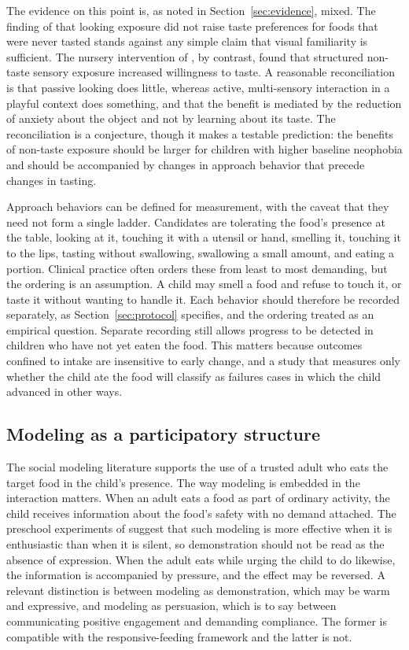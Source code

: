 \documentclass[11pt]{article}
\theoremstyle{remark}
\begin{document}
The evidence on this point is, as noted in Section~\ref{sec:evidence}, mixed. The finding of \citet{birch1987what} that looking exposure did not raise taste preferences for foods that were never tasted stands against any simple claim that visual familiarity is sufficient. The nursery intervention of \citet{dazeley2015exposure}, by contrast, found that structured non-taste sensory exposure increased willingness to taste. A reasonable reconciliation is that passive looking does little, whereas active, multi-sensory interaction in a playful context does something, and that the benefit is mediated by the reduction of anxiety about the object and not by learning about its taste. The reconciliation is a conjecture, though it makes a testable prediction: the benefits of non-taste exposure should be larger for children with higher baseline neophobia and should be accompanied by changes in approach behavior that precede changes in tasting.

Approach behaviors can be defined for measurement, with the caveat that they need not form a single ladder. Candidates are tolerating the food's presence at the table, looking at it, touching it with a utensil or hand, smelling it, touching it to the lips, tasting without swallowing, swallowing a small amount, and eating a portion. Clinical practice often orders these from least to most demanding, but the ordering is an assumption. A child may smell a food and refuse to touch it, or taste it without wanting to handle it. Each behavior should therefore be recorded separately, as Section~\ref{sec:protocol} specifies, and the ordering treated as an empirical question. Separate recording still allows progress to be detected in children who have not yet eaten the food. This matters because outcomes confined to intake are insensitive to early change, and a study that measures only whether the child ate the food will classify as failures cases in which the child advanced in other ways.

\subsection{Modeling as a participatory structure}

The social modeling literature supports the use of a trusted adult who eats the target food in the child's presence. The way modeling is embedded in the interaction matters. When an adult eats a food as part of ordinary activity, the child receives information about the food's safety with no demand attached. The preschool experiments of \citet{hendy2000effectiveness} suggest that such modeling is more effective when it is enthusiastic than when it is silent, so demonstration should not be read as the absence of expression. When the adult eats while urging the child to do likewise, the information is accompanied by pressure, and the effect may be reversed. A relevant distinction is between modeling as demonstration, which may be warm and expressive, and modeling as persuasion, which is to say between communicating positive engagement and demanding compliance. The former is compatible with the responsive-feeding framework \citep{black2011responsive} and the latter is not.
\end{document}
